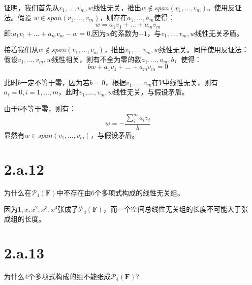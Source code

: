 \documentclass[10pt,a4paper,UTF8]{article}
\begin{document}
\begin{answer}
证明，我们首先从\(v_{1},\ldots ,v_{m},w\)线性无关，推出\(w\notin span(v_{1},\ldots ,v_{m})\)。使用反证法。假设 \(w\in span(v_{1},\ldots ,v_{m})\)，则存在\(a_{1},\ldots ,a_{m}\)使得：
\begin{equation}
\label{eq:11}
w = a_{1}v_{1} + \ldots + a_{m}v_{m}
\end{equation}
即:\(a_{1}v_{1} + \ldots + a_{m}v_{m} - w = 0\),因为\(w\)的系数为\(-1\)，与\(v_{1},\ldots ,v_{m},w\)线性无关矛盾。

接着我们从\(w\notin span(v_{1},\ldots ,v_{m})\)，推出\(v_{1},\ldots ,v_{m},w\)线性无关。同样使用反证法：假设\(v_{1},\ldots ,v_{m},w\)线性相关，则有不全为零的数\(a_{1},\ldots ,a_{m},b\)，使得：
\begin{equation}
\label{eq:12}
bw + a_{1}v_{1} + \ldots + a_{m}v_{m} = 0
\end{equation}

此时\(b\)一定不等于零，因为若\(b=0\)，根据\(v_{1},\ldots ,v_{m}\)在\(V\)中线性无关，则有\(a_{i}=0,i=1,\ldots ,m\)，此时\(v_{1},\ldots ,v_{m},w\)线性无关，与假设矛盾。

由于\(b\)不等于零，则有：
\begin{equation}
\label{eq:13}
w = -\frac{\sum_{i}^{m}a_{i}v_{i}}{b}
\end{equation}
显然有\(w\in span(v_{1},\ldots ,v_{m})\)，与假设矛盾。
\end{answer}

\section*{2.a.12}
\label{sec:org69d2e41}


\begin{problem}
为什么在\(\mathcal{P}_{4}(\mathbf{F})\)中不存在由6个多项式构成的线性无关组。
\end{problem}

\begin{answer}
因为\(1,x,x^{2},x^{3},x^{4}\)张成了\(\mathcal{P}_{4}(\mathbf{F})\)，而一个空间总线性无关组的长度不可能大于张成组的长度。
\end{answer}

\section*{2.a.13}
\label{sec:org71c4e73}


\begin{problem}
为什么4个多项式构成的组不能张成\(\mathcal{P}_{4}(\mathbf{F})\)?
\end{problem}
\end{document}
